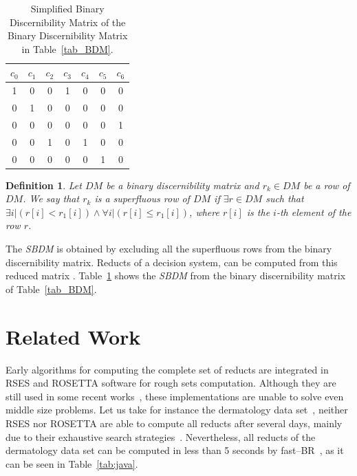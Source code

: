 \documentclass[number,preprint,review,12pt]{elsarticle}
\newtheorem{definition}{Definition}
\begin{document}
  \begin{table}[htb]
	\caption{Simplified Binary Discernibility Matrix of the Binary Discernibility Matrix in Table~\ref{tab_BDM}.}
	\centering
   	\begin{tabular}{ccccccc}\label{tab:SBDM1}
              $c_0$ & $c_1$ & $c_2$ & $c_3$ & $c_4$ & $c_5$ & $c_6$\\
          		\hline
          		1&0&0&1&0&0&0\\
          		0&1&0&0&0&0&0\\
          		0&0&0&0&0&0&1\\
          		0&0&1&0&1&0&0\\
          		0&0&0&0&0&1&0\\
   	\end{tabular}             
  \end{table}  
   
  \begin{definition}\label{def:basic_row}
	Let $DM$ be a binary discernibility matrix and $r_k \in DM$ be a row of $DM$. We say that $r_k$ is a superfluous row of $DM$ if $\exists r \in DM$ such that $\exists i | (r[i] < r_1[i]) \wedge \forall i | (r[i] \leq r_1[i])$, where $r[i]$ is the $i$-th element of the row $r$.

  \end{definition}

  The \textit{SBDM} is obtained by excluding all the superfluous rows from the binary discernibility matrix. Reducts of a decision system, can be computed from this reduced matrix \citep{Yao09}. Table~\ref{tab:SBDM1} shows the \textit{SBDM} from the binary discernibility matrix of Table~\ref{tab_BDM}.

 
 
\section{Related Work}\label{relatedWork}
  
  \label{early}
  Early algorithms for computing the complete set of reducts \citep{Bazan2001,Ohrn00} are integrated in RSES and ROSETTA software for rough sets computation. Although they are still used in some recent works~\cite{Slezak2011,Stawicki2017}, these implementations are unable to solve even middle size problems. Let us take for instance the dermatology data set~\citep{Bache13}, neither RSES nor ROSETTA are able to compute all reducts after several days, mainly due to their exhaustive search strategies~\citep{Lazo15}. Nevertheless, all reducts of the dermatology data set can be computed in less than 5 seconds by fast--BR~\citep{Lias13}, as it can be seen in Table~\ref{tab:java}.
\end{document}
